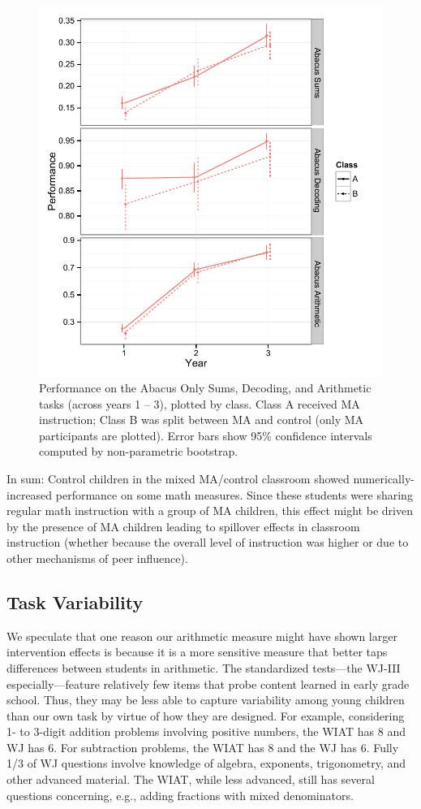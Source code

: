 \documentclass[11pt]{article}
\begin{document}
\begin{figure}[H]
\begin{center}
\includegraphics[width=4.5in]{figures/abacus_class.pdf}
\end{center}
\caption{Performance on the Abacus Only Sums, Decoding, and Arithmetic tasks (across years 1 -- 3), plotted by class. Class A received MA instruction; Class B was split between MA and control (only MA participants are plotted). Error bars show 95\% confidence intervals computed by non-parametric bootstrap.}
\label{fig:abacus_class}
\end{figure}


In sum: Control children in the mixed MA/control classroom showed numerically-increased performance on some math measures. Since these students were sharing regular math instruction with a group of MA children, this effect might be driven by the presence of MA children leading to spillover effects in classroom instruction (whether because the overall level of instruction was higher or due to other mechanisms of peer influence).

\subsection{Task Variability}

We speculate that one reason our arithmetic measure might have shown larger intervention effects is because it is a more sensitive measure that better taps differences between students in arithmetic. The standardized tests---the WJ-III especially---feature relatively few items that probe content learned in early grade school. Thus, they may be less able to capture variability among young children than our own task by virtue of how they are designed. For example, considering 1- to 3-digit addition problems involving positive numbers, the WIAT has 8 and WJ has 6. For subtraction problems, the WIAT has 8 and the WJ has 6. Fully 1/3 of WJ questions involve knowledge of algebra, exponents, trigonometry, and other advanced material. The WIAT, while less advanced, still has several questions concerning, e.g., adding fractions with mixed denominators. 
\end{document}
